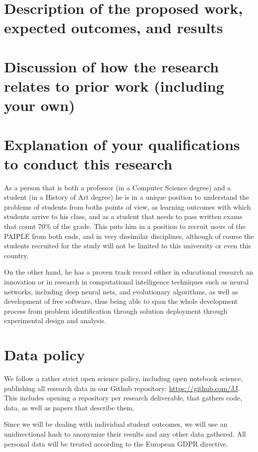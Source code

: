 \documentclass[a4paper,12pt]{article}
\begin{document}
\section{Description of the proposed work, expected outcomes, and results}


\section{Discussion of how the research relates to prior work (including your
  own)}

\section{Explanation of your qualifications to conduct this research}

As a person that is both a professor (in a Computer Science degree) and a
student (in a History of Art degree) he is in a unique position to understand
the problems of students from boths points of view, as learning outcomes with
which students arrive to his class, and as a student that needs to pass written
exams that count 70\% of the grade. This puts him in a position to recruit users
of the PAIPLE from both ends, and in very dissimilar disciplines, although of
course the students recruited for the study will not be limited to this
university or even this country.

On the other hand, he has a proven track record either in educational research
an innovation
\cite{DBLP:conf/ijcci/ValdezGHS17,DBLP:journals/eait/MereloCMBAGT24} or in
research in computational intelligence techniques such as neural networks,
including deep neural nets, and evolutionary algorithms, as well as development
of free software, thus being able to span the whole development process from
problem identification through solution deployment through experimental design
and analysis.

\section{Data policy}

We follow a rather strict open science policy, including open notebook science,
publishing all research data in our Github repository:
\url{https://github.com/JJ}. This includes opening a repository per research
  deliverable, that gathers code, data, as well as papers that describe them.

Since we will be dealing with individual student outcomes, we will use an
unidirectional hash to anonymize their results and any other data gathered. All
personal data will be treated according to the European GDPR directive.
\end{document}
